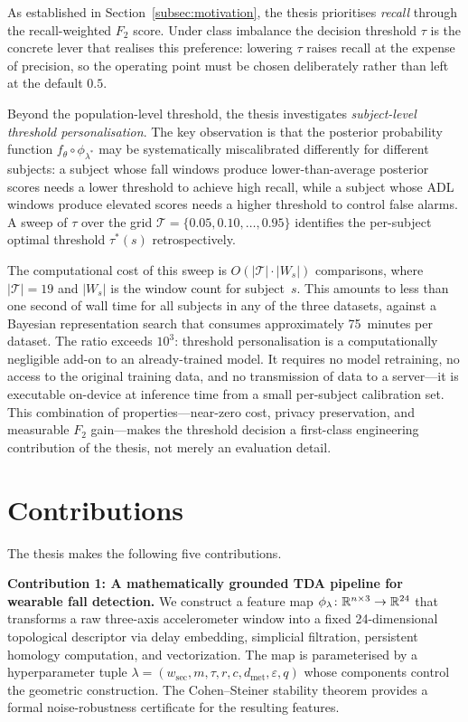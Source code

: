 As established in Section~\ref{subsec:motivation}, the thesis prioritises \emph{recall}
through the recall-weighted $F_2$ score. Under class imbalance the decision threshold
$\tau$ is the concrete lever that realises this preference: lowering $\tau$ raises
recall at the expense of precision, so the operating point must be chosen deliberately
rather than left at the default $0.5$.

Beyond the population-level threshold, the thesis investigates \emph{subject-level
threshold personalisation}.  The key observation is that the posterior probability
function $f_\theta\circ\phi_{\lambda^*}$ may be systematically miscalibrated
differently for different subjects: a subject whose fall windows produce
lower-than-average posterior scores needs a lower threshold to achieve high recall,
while a subject whose ADL windows produce elevated scores needs a higher threshold to
control false alarms.  A sweep of $\tau$ over the grid
$\mathcal{T}=\{0.05,0.10,\ldots,0.95\}$ identifies the per-subject optimal threshold
$\tau^*(s)$ retrospectively.

The computational cost of this sweep is $O(|\mathcal{T}|\cdot|W_s|)$ comparisons,
where $|\mathcal{T}|=19$ and $|W_s|$ is the window count for subject~$s$.  This
amounts to less than one second of wall time for all subjects in any of the three
datasets, against a Bayesian representation search that consumes approximately
75~minutes per dataset.  The ratio exceeds $10^3$: threshold personalisation is a
computationally negligible add-on to an already-trained model.  It requires no model
retraining, no access to the original training data, and no transmission of data to
a server---it is executable on-device at inference time from a small per-subject
calibration set.  This combination of properties---near-zero cost, privacy
preservation, and measurable $F_2$ gain---makes the threshold decision a first-class
engineering contribution of the thesis, not merely an evaluation detail.

\section{Contributions}
\label{subsec:contributions}

The thesis makes the following five contributions.

\textbf{Contribution 1: A mathematically grounded TDA pipeline for wearable fall
detection.}  We construct a feature map $\phi_\lambda\colon\mathbb{R}^{n\times 3}\to\mathbb{R}^{24}$
that transforms a raw three-axis accelerometer window into a fixed 24-dimensional
topological descriptor via delay embedding, simplicial filtration, persistent homology
computation, and vectorization.  The map is parameterised by a hyperparameter tuple
$\lambda=(w_\mathrm{sec},m,\tau,r,c,d_\mathrm{met},\varepsilon,q)$ whose components
control the geometric construction.  The Cohen--Steiner stability theorem provides a
formal noise-robustness certificate for the resulting features.

